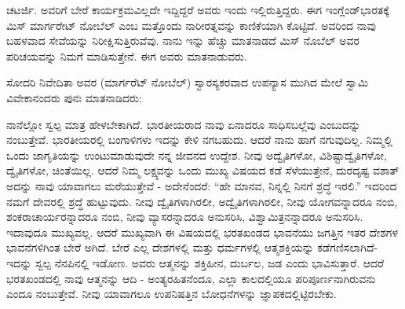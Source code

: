 ಚಟರ್ಜಿ. ಅವರಿಗೆ ಬೇರೆ ಕಾರ್ಯಕ್ರಮವಿಲ್ಲದೇ ಇದ್ದಿದ್ದರೆ ಅವರು ಇಂದು ಇಲ್ಲಿರುತ್ತಿದ್ದರು. ಈಗ ಇಂಗ್ಲೆಂಡ್​ ಭಾರತಕ್ಕೆ ಮಿಸ್​ ಮಾರ್ಗರೇಟ್​ ನೋಬೆಲ್​ ಎಂಬ ಮತ್ತೊಂದು ನಾರೀರತ್ನವನ್ನು ಕಾಣಿಕೆಯಾಗಿ ಕೊಟ್ಟಿದೆ. ಅವರಿಂದ ನಾವು ಬಹಳವಾದ ಸೇವೆಯನ್ನು ನಿರೀಕ್ಷಿಸುತ್ತಿರುವೆವು. ನಾನು ಇನ್ನು ಹೆಚ್ಚು ಮಾತನಾಡದೆ ಮಿಸ್​ ನೊಬೆಲ್​ ಅವರ ಪರಿಚಯವನ್ನು ನಿಮಗೆ ಮಾಡಿಸುತ್ತೇನೆ. ಈಗ ಅವರು ಮಾತನಾಡುವರು.

\vskip 5pt

ಸೋದರಿ ನಿವೇದಿತಾ ಅವರ (ಮಾರ್ಗರೆಟ್​ ನೋಬೆಲ್​) ಸ್ವಾರಸ್ಯಕರವಾದ ಉಪನ್ಯಾಸ ಮುಗಿದ ಮೇಲೆ ಸ್ವಾಮಿ ವಿವೇಕಾನಂದರು ಪುನಃ ಮಾತನಾಡಿದರು:

\vskip 5pt

ನಾನೆಲ್ಲೋ ಸ್ವಲ್ಪ ಮಾತ್ರ ಹೇಳಬೇಕಾಗಿದೆ. ಭಾರತೀಯರಾದ ನಾವು ಏನಾದರೂ ಸಾಧಿಸಬಲ್ಲೆವು ಎಂಬುದನ್ನು ನಂಬುತ್ತೇವೆ. ಭಾರತೀಯರಲ್ಲಿ ಬಂಗಾಳಿಗಳು ಇದನ್ನು ಕೇಳಿ ನಗಬಹುದು. ಆದರೆ ನಾನು ಹಾಗೆ ನಗುವುದಿಲ್ಲ. ನಿಮ್ಮಲ್ಲಿ ಒಂದು ಜಾಗೃತಿಯನ್ನು ಉಂಟುಮಾಡುವುದೇ ನನ್ನ ಜೀವನದ ಉದ್ದೇಶ. ನೀವು ಅದ್ವೈತಿಗಳೋ, ವಿಶಿಷ್ಟಾದ್ವೈತಿಗಳೋ, ದ್ವೈತಿಗಳೋ, ಚಿಂತೆಯಿಲ್ಲ. ಆದರೆ ನಿಮ್ಮ ಲಕ್ಷ್ಯವನ್ನು ಒಂದು ಮುಖ್ಯ ವಿಷಯದ ಕಡೆ ಸೆಳೆಯುತ್ತೇನೆ, ದುರದೃಷ್ಟ ವಶಾತ್​ ಅದನ್ನು ನಾವು ಯಾವಾಗಲು ಮರೆಯುತ್ತೇವೆ - ಅದೇನೆಂದರೆ: “ಹೇ ಮಾನವ, ನಿನ್ನಲ್ಲಿ ನಿನಗೆ ಶ್ರದ್ಧೆ ಇರಲಿ.” ಇದರಿಂದ ನಮಗೆ ದೇವರಲ್ಲಿ ಶ್ರದ್ಧೆ ಹುಟ್ಟುವುದು. ನೀವು ದ್ವೈತಿಗಳಾಗಿರಲೀ, ಅದ್ವೈತಿಗಳಾಗಿರಲೀ, ನೀವು ಯೋಗವನ್ನಾದರೂ ನಂಬಿ, ಶಂಕರಾಚಾರ್ಯರನ್ನಾದರೂ ನಂಬಿ, ನೀವು ವ್ಯಾಸರನ್ನಾದರೂ ಅನುಸರಿಸಿ, ವಿಶ್ವಾಮಿತ್ರನನ್ನಾದರೂ ಅನುಸರಿಸಿ. ಇದಾವುದೂ ಮುಖ್ಯವಲ್ಲ. ಆದರೆ ಮುಖ್ಯವಾಗಿ ಈ ವಿಷಯದಲ್ಲಿ ಭರತಖಂಡದ ಭಾವನೆಯು ಜಗತ್ತಿನ ಇತರ ದೇಶಗಳ ಭಾವನೆಗಳಿಗಿಂತ ಬೇರೆ ಅಗಿದೆ. ಬೇರೆ ಎಲ್ಲ ದೇಶಗಳಲ್ಲಿ ಮತ್ತು ಧರ್ಮಗಳಲ್ಲಿ ಆತ್ಮಶಕ್ತಿಯನ್ನು ಕಡೆಗಣಿಸಲಾಗಿದೆ-ಇದನ್ನು ಸ್ವಲ್ಪ ನೆನಪಿನಲ್ಲಿ ಇಡೋಣ. ಅವರು ಆತ್ಮನನ್ನು ಶಕ್ತಿಹೀನ, ದುರ್ಬಲ, ಜಡ ಎಂದು ಭಾವಿಸುತ್ತಾರೆ. ಆದರೆ ಭರತಖಂಡದಲ್ಲಿ ನಾವು ಆತ್ಮನನ್ನು ಆದಿ - ಅಂತ್ಯರಹಿತನೆಂದೂ, ಎಲ್ಲಾ ಕಾಲದಲ್ಲಿಯೂ ಪರಿಪೂರ್ಣನಾಗಿರುವನು ಎಂದೂ ನಂಬುತ್ತೇವೆ. ನೀವು ಯಾವಾಗಲೂ ಉಪನಿಷತ್ತಿನ ಬೋಧನೆಗಳನ್ನು ಜ್ಞಾಪಕದಲ್ಲಿಟ್ಟಿರಬೇಕು.

\vskip 7pt

